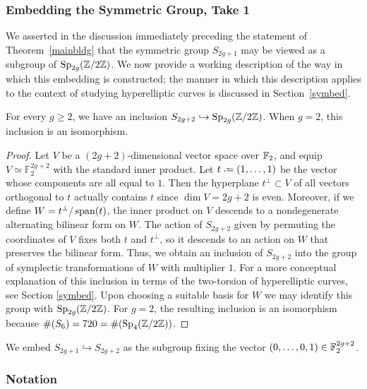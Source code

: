 \subsubsection{Embedding the Symmetric Group, Take 1} \label{take1}

We asserted in the discussion immediately preceding the statement of Theorem~\ref{mainbldg} that the symmetric group $S_{2g+1}$ may be viewed as a subgroup of $\operatorname{Sp}_{2g}(\mathbb Z/2\mathbb Z)$. We now provide a working description of the way in which this embedding is constructed; the manner in which this description applies to the context of studying hyperelliptic curves is discussed in Section~\ref{symbed}.
\begin{lemma} \label{lemma:include-s}
For every $g \ge 2$, we have an inclusion $S_{2g+2} \hookrightarrow \operatorname{Sp}_{2g}({\mathbb Z} /2 \mathbb Z)$.
When $g = 2$, this inclusion is an isomorphism. 
\end{lemma}
\begin{proof} 
	Let $V$ be a $(2g+2)$-dimensional vector space over $\mathbb F_2$, and equip $V \simeq \mathbb{F}_2^{2g+2}$ with the standard inner product. Let $t \defeq (1, \ldots, 1)$ be the vector whose components are all equal to $1$. Then the hyperplane $t^\perp \subset V$ of all vectors orthogonal to $t$ actually contains $t$ since $\dim V = 2g+2$ is even. Moreover, if we define $W = t^\perp / \operatorname{span}(t)$, the inner product on $V$ descends to a nondegenerate alternating bilinear form on $W$. The action of $S_{2g+2}$ given by permuting the coordinates of $V$ fixes both $t$ and $t^\perp$, so it descends to an action on $W$ that preserves the bilinear form. 
Thus, we obtain an inclusion of $S_{2g+2}$ into the group of symplectic transformations of $W$ with multiplier $1$. For a more conceptual
explanation of this inclusion in terms of the two-torsion of hyperelliptic
curves, see Section \ref{symbed}.
Upon choosing a suitable basis for $W$ we may identify this group with $\operatorname{Sp}_{2g}(\mathbb Z / 2 \mathbb Z)$. For $g = 2$, the resulting inclusion is an isomorphism because $\#(S_6) = 720 = \#(\operatorname{Sp}_4(\mathbb Z / 2 \mathbb Z))$.
\end{proof}
We embed $S_{2g+1} \hookrightarrow S_{2g+2}$ as the subgroup fixing the vector $(0,\dots,0,1) \in \mathbb F_2^{2g+2}$.

\subsubsection{Notation}
\label{subsection:notation}

